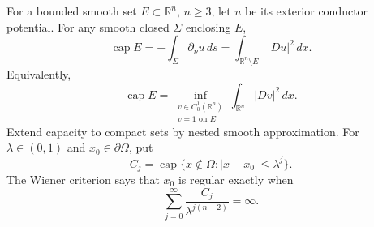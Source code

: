 For a bounded smooth set $E\subset\mathbb R^n$, $n\geq3$, let $u$ be its
exterior conductor potential. For any smooth closed $\Sigma$ enclosing $E$,
\begin{equation}
\tag{2.35}
\operatorname{cap}E
=-\int_\Sigma\partial_\nu u\,ds
=\int_{\mathbb R^n\setminus E}|Du|^2\,dx.
\end{equation}
Equivalently,
\begin{equation}
\tag{2.36}
\operatorname{cap}E
=\inf_{\substack{v\in C_0^1(\mathbb R^n)\\v=1\text{ on }E}}
\int_{\mathbb R^n}|Dv|^2\,dx.
\end{equation}
Extend capacity to compact sets by nested smooth approximation. For
$\lambda\in(0,1)$ and $x_0\in\partial\Omega$, put
\[
C_j=\operatorname{cap}\{x\notin\Omega:|x-x_0|\leq\lambda^j\}.
\]
The Wiener criterion says that $x_0$ is regular exactly when
\begin{equation}
\tag{2.37}
\sum_{j=0}^\infty\frac{C_j}{\lambda^{j(n-2)}}=\infty.
\end{equation}
